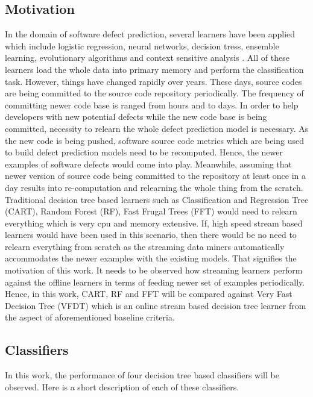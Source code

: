 \documentclass[sigplan]{acmart}\settopmatter{printfolios=true,printccs=false,printacmref=false}
\begin{document}
\subsection{Motivation}
In the domain of software defect prediction, several learners have been applied which include logistic regression, neural networks, decision tress, ensemble learning, evolutionary algorithms and context sensitive analysis \cite{menzies2011local, basili1996validation, hassan2009predicting, zimmermann2007predicting, bettenburg2012think, dietterich2000experimental,briand2001replicated,panichella2014cross}. All of these learners load the whole data into primary memory and perform the classification task. However, things have changed rapidly over years. These days, source codes are being committed to the source code repository periodically. The frequency of committing newer code base is ranged from hours and to days. In order to help developers with new potential defects while the new code base is being committed, necessity to relearn the whole defect prediction model is necessary. As the new code is being pushed, software source code metrics which are being used to build defect prediction models need to be recomputed. Hence, the newer examples of software defects would come into play. Meanwhile, assuming that newer version of source code being committed to the repository at least once in a day results into re-computation and relearning the whole thing from the scratch. Traditional decision tree based learners such as Classification and Regression Tree (CART), Random Forest (RF), Fast Frugal Trees (FFT) would need to relearn everything which is very cpu and memory extensive. If, high speed stream based learners would have been used in this scenario, then there would be no need to relearn everything from scratch as the streaming data miners automatically accommodates the newer examples with the existing models. That signifies the motivation of this work. It needs to be observed how streaming learners perform against the offline learners in terms of feeding newer set of examples periodically. Hence, in this work, CART, RF and FFT will be compared against Very Fast Decision Tree (VFDT) which is an online stream based decision tree learner from the aspect of aforementioned baseline criteria.

\subsection{Classifiers}
In this work, the performance of four decision tree based classifiers will be observed. Here is a short description of each of these classifiers.
\end{document}

